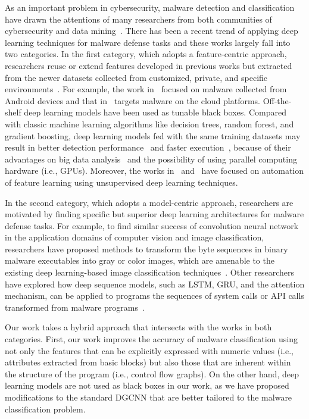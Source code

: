 
As an important problem in cybersecurity, malware detection and classification have drawn the attentions of many researchers from both communities of cybersecurity and data mining~\cite{MalDetectSurvey1, MalDetectSurvey2}.
There has been a recent trend of applying deep learning techniques for malware defense tasks and these works largely fall into two categories.
In the first category, which adopts a feature-centric approach, researchers reuse or extend features developed in previous works but extracted from the newer datasets collected from customized, private, and specific environments~\cite{EarlyStageRnn, DeepFlow, DeepAM, RandomProjectionNn, AutoEncoderFeatureLearn, AutoEncoderMicrosoft, LstmSyscall, MalwareLstmGru}.
For example, the work in~\cite{DeepFlow} focused on malware collected from Android devices and that in~\cite{DeepAM} targets malware on the cloud platforms.
Off-the-shelf deep learning models have been used as tunable black boxes.
Compared with classic machine learning algorithms like decision trees, random forest, and gradient boosting,
deep learning models fed with the same training datasets may result in better detection performance~\cite{DeepFlow,RandomProjectionNn} and faster execution~\cite{EarlyStageRnn},
because of their advantages on big data analysis~\cite{RandomProjectionNn} and the possibility of using parallel computing hardware (i.e., GPUs).
Moreover, the works in~\cite{AutoEncoderFeatureLearn} and~\cite{AutoEncoderMicrosoft} have focused on automation of feature learning using unsupervised deep learning techniques.

In the second category, which adopts a model-centric approach, researchers are motivated by finding specific but superior deep learning architectures for malware defense tasks.
For example, to find similar success of convolution neural network in the application domains of computer vision and image classification, researchers have proposed methods to transform the byte sequences in binary malware executables into gray or color images, which are amenable to the existing deep learning-based image classification techniques~\cite{R2D2, GibertCnn}. Other researchers have explored how deep sequence models, such as LSTM, GRU, and the attention mechanism, can be applied to programs the sequences of system calls or API calls transformed from malware programs~\cite{LstmSyscall,MalwareLstmGru}. 

Our work takes a hybrid approach that intersects with the works in both categories. First, our work improves the accuracy of malware classification using not only the features that can be explicitly expressed with numeric values (i.e., attributes extracted from basic blocks) but also those that are inherent within the structure of the program (i.e., control flow graphs). On the other hand, deep learning models are not used as black boxes in our work, as we have proposed modifications to the standard DGCNN that are better tailored to the malware classification problem.

